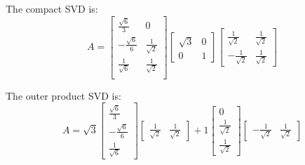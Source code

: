 \begin{enumerate}
{    The compact SVD is:
    \begin{equation}
      A =
      \begin{bmatrix}
      \frac{\sqrt{6}}{3} & 0 \\
      -\frac{\sqrt{6}}{6} & \frac{1}{\sqrt{2}} \\
      \frac{1}{\sqrt{6}} & \frac{1}{\sqrt{2}} \\ \end{bmatrix}
      \begin{bmatrix} \sqrt{3} & 0 \\ 0 & 1 \end{bmatrix}
      \begin{bmatrix}
      \frac{1}{\sqrt{2}} & \frac{1}{\sqrt{2}} \\
      -\frac{1}{\sqrt{2}} & \frac{1}{\sqrt{2}} \end{bmatrix}
    \end{equation}

    The outer product SVD is:
    \begin{equation}
      A = \sqrt{3}
        \begin{bmatrix} \frac{\sqrt{6}}{3} \\ -\frac{\sqrt{6}}{6} \\ \frac{1}{\sqrt{6}} \end{bmatrix} \begin{bmatrix} \frac{1}{\sqrt{2}} & \frac{1}{\sqrt{2}} \end{bmatrix}
        + 1 \begin{bmatrix} 0 \\ \frac{1}{\sqrt{2}} \\ \frac{1}{\sqrt{2}} \end{bmatrix} \begin{bmatrix} -\frac{1}{\sqrt{2}} & \frac{1}{\sqrt{2}} \end{bmatrix}
    \end{equation}
  }
\end{enumerate}
